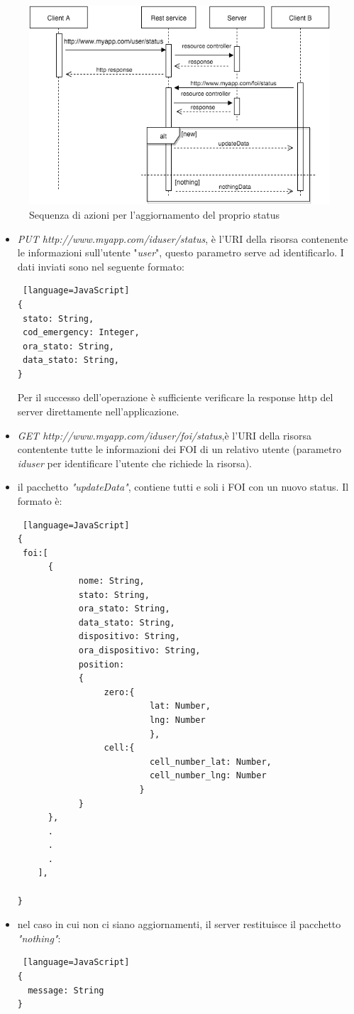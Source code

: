  \begin{figure}[H]
	\centering
	\includegraphics[scale=0.8]{Implementazione/updateStatus.png}
	\caption{Sequenza di azioni per l'aggiornamento del proprio status }
	\label{fig:rest}
\end{figure}
\begin{itemize}
\item \textit{PUT http://www.myapp.com/iduser/status}, è l'URI della risorsa contenente le informazioni sull'utente "\textit{user}", questo parametro serve ad identificarlo. I dati inviati sono nel seguente formato:
\begin{lstlisting} [language=JavaScript]
{
 stato: String,
 cod_emergency: Integer,
 ora_stato: String,
 data_stato: String,
}
\end{lstlisting}
Per il successo dell'operazione è sufficiente verificare la response http del server direttamente nell'applicazione.
\item \textit{GET http://www.myapp.com/iduser/foi/status},è l'URI della risorsa contentente tutte le informazioni dei FOI di un relativo utente (parametro \textit{iduser} per identificare l'utente che richiede la risorsa).
\item il pacchetto \textit{"updateData"}, contiene tutti e soli i FOI con un nuovo status. Il formato è:
\begin{lstlisting} [language=JavaScript]
{
 foi:[
	  {
			nome: String,
			stato: String,
			ora_stato: String,
			data_stato: String,
			dispositivo: String,
			ora_dispositivo: String,
			position: 
			{
			     zero:{
			              lat: Number,
			              lng: Number
			              },
			     cell:{
			              cell_number_lat: Number,
			              cell_number_lng: Number
			            }
			}
	  },
	  .
	  .
	  .
	],
  
}
\end{lstlisting}
\item nel caso in cui non ci siano aggiornamenti, il server restituisce il pacchetto \textit{"nothing"}:
\begin{lstlisting} [language=JavaScript]
{
  message: String
}
\end{lstlisting}
\end{itemize}

